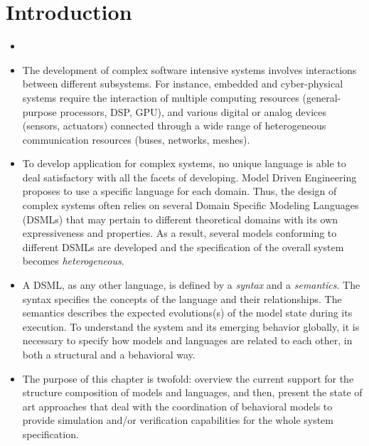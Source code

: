 \section{Introduction}
\begin{itemize}
	\item {}
	\item The development of complex software intensive systems involves interactions between different subsystems. For instance, embedded and cyber-physical systems require the interaction of multiple computing resources (general-purpose processors, DSP, GPU), and various digital or analog devices (sensors, actuators) connected through a wide range of heterogeneous communication resources (buses, networks, meshes). 
	
	\item To develop application for complex systems, no unique language is able to deal satisfactory with all the facets of developing. Model Driven Engineering proposes to use a specific language for each domain. Thus, the design of complex systems often relies on several Domain Specific Modeling Languages (DSMLs) that may pertain to different theoretical domains with its own expressiveness and properties. As a result, several models conforming to different DSMLs are developed and the specification of the overall system becomes \emph{heterogeneous}. 
	
	\item A DSML, as any other language, is defined by a \emph{syntax} and a \emph{semantics}. The syntax specifies the concepts of the language and their relationships. The semantics describes the expected evolutions(s) of the model state during its execution. To understand the system and its emerging behavior globally, it is necessary to specify how models and languages are related to each other, in both a structural and a behavioral way. 
	
	\item The purpose of this chapter is twofold: overview the current support for the structure composition of models and languages, and then, present the state of art approaches that deal with the coordination of behavioral models to provide simulation and/or verification capabilities for the whole system specification. 
	  

\end{itemize}